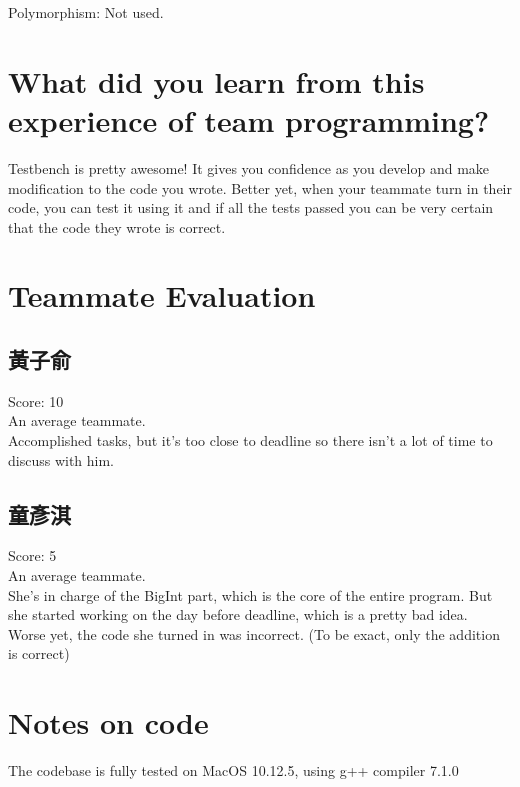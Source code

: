 \documentclass[12pt, A4]{article}
\begin{document}
    Polymorphism: Not used.
    
    \section{What did you learn from this experience of team programming?}
    
    Testbench is pretty awesome! It gives you confidence as you develop and make modification to the code you wrote. Better yet, when your teammate turn in their code, you can test it using it and if all the tests passed you can be very certain that the code they wrote is correct.
    
    \section{Teammate Evaluation}
    
    \subsection{黃子俞}
    
    Score: 10\\
    
    An average teammate. \\
    
    Accomplished tasks, but it's too close to deadline so there isn't a lot of time to discuss with him. \\
    
    \subsection{童彥淇}
    
    Score: 5\\
    
    An average teammate. \\
    
    She's in charge of the BigInt part, which is the core of the entire program. But she started working on the day before deadline, which is a pretty bad idea.\\ Worse yet, the code she turned in was incorrect. (To be exact, only the addition is correct)
    
    \section{Notes on code}
    
    The codebase is fully tested on MacOS 10.12.5, using g++ compiler 7.1.0\\
    
\end{document}
